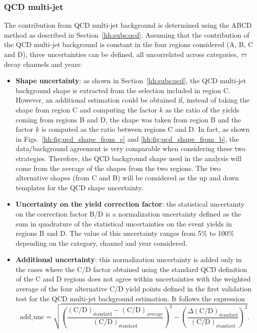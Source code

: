 \documentclass[../main.tex]{subfiles}
\begin{document}
\subsubsection*{QCD multi-jet}

The contribution from QCD multi-jet background is determined using the ABCD method as described in Section~\ref{hh:subs:qcd}. Assuming that the contribution of the QCD multi-jet background is constant in the four regions considered (A, B, C and D), three uncertainties can be defined, all uncorrelated across categories, $\tau\tau$ decay channels and years:
\begin{itemize}
\item \textbf{Shape uncertainty}: as shown in Section~\ref{hh:subs:qcd}, the QCD multi-jet background shape is extracted from the selection included in region C. However, an additional estimation could be obtained if, instead of taking the shape from region C and computing the factor $k$ as the ratio of the yields coming from regions B and D, the shape was taken from region B and the factor $k$ is computed as the ratio between regions C and D. In fact, as shown in Figs.~\ref{hh:fig:qcd_shape_from_c} and \ref{hh:fig:qcd_shape_from_b}, the data/background agreement is very comparable when considering these two strategies. Therefore, the QCD background shape used in the analysis will come from the average of the shapes from the two regions. The two alternative shapes (from C and B) will be considered as the up and down templates for the QCD shape uncertainty.
\item \textbf{Uncertainty on the yield correction factor}: the statistical uncertainty on the correction factor B/D is a normalization uncertainty defined as the sum in quadrature of the statistical uncertainties on the event yields in regions B and D. The value of this uncertainty ranges from 5\% to 100\% depending on the category, channel and year considered.
\item \textbf{Additional uncertainty}: this normalization uncertainty is added only in the cases where the C/D factor obtained using the standard QCD definition of the C and D regions does not agree within uncertainties with the weighted average of the four alternative C/D yield points defined in the first validation test for the QCD multi-jet background estimation. It follows the expression
\begin{equation}
\text{add\_unc} = \sqrt{\left(\frac{(\text{C/D})_{\text{standard}} - (\text{C/D})_{\text{average}}}{(\text{C/D})_{\text{standard}}} \right)^2 - \left(\frac{\Delta(\text{C/D})_{\text{standard}}}{(\text{C/D})_{\text{standard}}} \right)^2}.
\end{equation}
\end{itemize}
\end{document}
